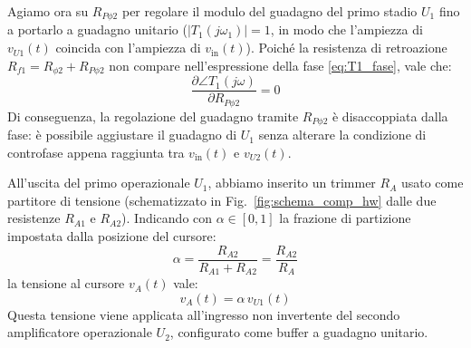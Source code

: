 \documentclass[11pt,a4paper]{article}
\begin{document}
\vspace{0.3cm}
\noindent Agiamo ora su $R_{P\phi 2}$ per regolare il modulo del guadagno del primo stadio $U_1$ fino a portarlo a guadagno unitario ($|T_1(j\omega_1)| = 1$, in modo che l'ampiezza di $v_{U1}(t)$ coincida con l'ampiezza di $v_{\text{in}}(t)$). Poiché la resistenza di retroazione $R_{f1} = R_{\phi 2} + R_{P\phi 2}$ non compare nell'espressione della fase \eqref{eq:T1_fase}, vale che:
\begin{equation}
    \frac{\partial \angle T_1(j\omega)}{\partial R_{P\phi 2}} = 0
\end{equation}
Di conseguenza, la regolazione del guadagno tramite $R_{P\phi 2}$ è disaccoppiata dalla fase: è possibile aggiustare il guadagno di $U_1$ senza alterare la condizione di controfase appena raggiunta tra $v_{\text{in}}(t)$ e $v_{U2}(t)$.

\vspace{0.3cm}
\noindent All'uscita del primo operazionale $U_1$, abbiamo inserito un trimmer $R_A$ usato come partitore di tensione (schematizzato in Fig.~\ref{fig:schema_comp_hw} dalle due resistenze $R_{A1}$ e $R_{A2}$). Indicando con $\alpha \in [0, 1]$ la frazione di partizione impostata dalla posizione del cursore:
\begin{equation}
    \alpha = \frac{R_{A2}}{R_{A1} + R_{A2}} = \frac{R_{A2}}{R_A}
\end{equation}
la tensione al cursore $v_A(t)$ vale:
\begin{equation}
    v_A(t) = \alpha \, v_{U1}(t)
\end{equation}
Questa tensione viene applicata all'ingresso non invertente del secondo amplificatore operazionale $U_2$, configurato come buffer a guadagno unitario.
\end{document}
